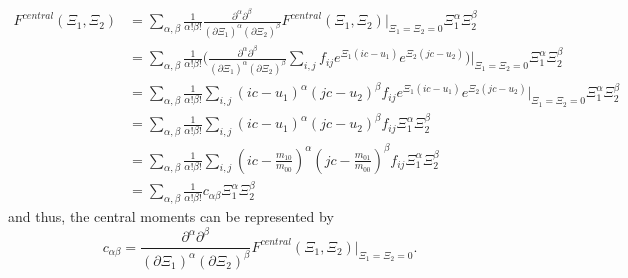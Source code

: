 \begin{equation}
  \label{eq: taylor of Fc}
  \begin{aligned}
    F^{central}(\Xi_1, \Xi_2) & = \sum_{\alpha,\beta} \frac{1}{\alpha!\beta!} \frac{\partial^\alpha\partial^\beta}{{(\partial \Xi_1)}^\alpha{(\partial \Xi_2)}^\beta} F^{central}(\Xi_1, \Xi_2)\Bigr|_{\Xi_1=\Xi_2 = 0} \Xi_1^\alpha \Xi_2^\beta \\
    & = \sum_{\alpha,\beta} \frac{1}{\alpha!\beta!} \Bigg(
      \frac{\partial^\alpha\partial^\beta}{{(\partial \Xi_1)}^\alpha{(\partial \Xi_2)}^\beta}
        \sum_{i,j}f_{ij} e^{\Xi_1 (ic-u_1)} e^{\Xi_2 (jc-u_2)} \Bigg)\Bigr|_{\Xi_1=\Xi_2 = 0} \Xi_1^\alpha \Xi_2^\beta \\
    & = \sum_{\alpha,\beta} \frac{1}{\alpha!\beta!}
      \sum_{i,j} {(ic-u_1)}^\alpha {(jc-u_2)}^\beta f_{ij} e^{\Xi_1 (ic-u_1)} e^{\Xi_2 (jc-u_2)} \Bigr|_{\Xi_1=\Xi_2 = 0} \Xi_1^\alpha \Xi_2^\beta \\
    & = \sum_{\alpha,\beta}
        \frac{1}{\alpha!\beta!}
        \sum_{i,j} {\left(ic - u_1\right)}^\alpha {\left(jc - u_2\right)}^\beta f_{ij} \Xi_1^\alpha \Xi_2^\beta \\
    & = \sum_{\alpha,\beta} \frac{1}{\alpha!\beta!}
      \sum_{i,j} {\left(ic - \frac{m_{10}}{m_{00}}\right)}^\alpha {\left(jc - \frac{m_{01}}{m_{00}}\right)}^\beta f_{ij} \Xi_1^\alpha \Xi_2^\beta \\
    & = \sum_{\alpha,\beta} \frac{1}{\alpha!\beta!} c_{\alpha\beta} \Xi_1^\alpha \Xi_2^\beta
  \end{aligned}
\end{equation}
%
and thus, the central moments can be represented by
\begin{equation}
  \label{eq: alternative representation of central moments}
  c_{\alpha\beta} = \frac{\partial^\alpha\partial^\beta}{{(\partial \Xi_1)}^\alpha{(\partial \Xi_2)}^\beta} F^{central}(\Xi_1, \Xi_2)\Bigr|_{\Xi_1=\Xi_2 = 0}.
\end{equation}


